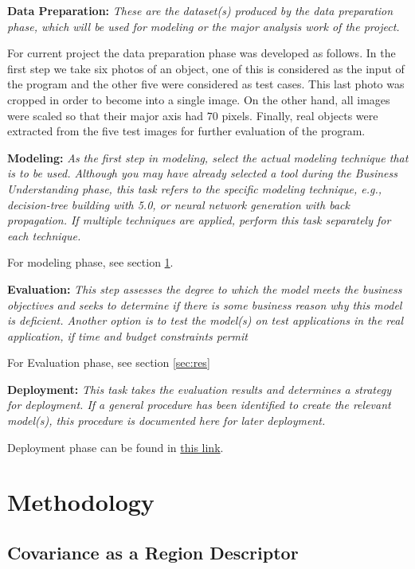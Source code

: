 \documentclass[11pt]{article}
\theoremstyle{definition}
\theoremstyle{remark}
\theoremstyle{remark}
\theoremstyle{remark}
\begin{document}
\textbf{Data Preparation:} \textit{These are the dataset(s) produced by the data
  preparation phase, which will be used for modeling or the major analysis work
  of the project.}

For current project the data preparation phase was developed as follows. In the
first step we take six photos of an object, one of this is considered as the
input of the program and the other five were considered as test cases. This last
photo was cropped in order to become into a single image. On the other hand, all
images were scaled so that their major axis had 70 pixels. Finally, real objects
were extracted from the five test images for further evaluation of the program.

\textbf{Modeling:} \textit{As the first step in modeling, select the actual
  modeling technique that is to be used. Although you may have already selected
  a tool during the Business Understanding phase, this task refers to the
  specific modeling technique, e.g., decision-tree building with 5.0, or neural
  network generation with back propagation. If multiple techniques are applied,
  perform this task separately for each technique. }

For modeling phase, see section \ref{sec:meth}.

\textbf{Evaluation:} \textit{This step assesses the degree to which the model
  meets the business objectives and seeks to determine if there is some business
  reason why this model is deficient. Another option is to test the model(s) on
  test applications in the real application, if time and budget constraints
  permit}

For Evaluation phase, see section \ref{sec:res}

\textbf{Deployment:} \textit{This task takes the evaluation results and
  determines a strategy for deployment. If a general procedure has been
  identified to create the relevant model(s), this procedure is documented here
  for later deployment.}

Deployment phase can be found in \href{https://bit.ly/3rQbVRQ}{this link}.


\section{Methodology}\label{sec:meth}

\subsection{Covariance as a Region Descriptor}
\end{document}
